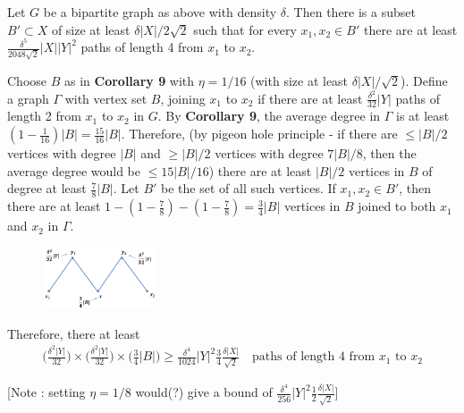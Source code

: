\documentclass[10pt,a4paper]{report}
\newenvironment{proof}
{\begin{changemargin}{1cm}{0.5cm}
	}%
	{\end{changemargin}
}
\begin{document}
\s

 Let $G$ be a bipartite graph as above with density $\delta$. Then there is a subset $B'\subset X$ of size at least $\delta |X|/2\sqrt{2}$ such that for every $x_1, x_2 \in B'$ there are at least $\frac{\delta^5}{2048 \sqrt{2}} |X| |Y|^2$ paths of length 4 from $x_1$ to $x_2$. 
\begin{proof}
\pf Choose $B$ as in \textbf{Corollary 9} with $\eta = 1/16$ (with size at least $\delta |X|/\sqrt{2}$). Define a graph $\Gamma$ with vertex set $B$, joining $x_1$ to $x_2$ if there are at least $\frac{\delta^2}{32}|Y|$ paths of length 2 from $x_1$ to $x_2$ in $G$. By \textbf{Corollary 9}, the average degree in $\Gamma$ is at least $(1-\frac{1}{16})|B| = \frac{15}{16}|B|$. Therefore, (by pigeon hole principle - if there are $\leq |B|/2$ vertices with degree $|B|$ and $\geq |B|/2$ vertices with degree $7|B|/8$, then the average degree would be $\leq 15|B|/16$) there are at least $|B|/2$ vertices in $B$ of degree at least $\frac{7}{8}|B|$. Let $B'$ be the set of all such vertices. If $x_1,x_2\in B'$, then there are at least $1-(1-\frac{7}{8})-(1-\frac{7}{8})=\frac{3}{4} |B|$ vertices in $B$ joined to both $x_1$ and $x_2$ in $\Gamma$.
\begin{figure}[h]
	\centering
	\includegraphics[width=0.3\textwidth]{1}
\end{figure}
Therefore, there at least
\begin{align*}
\Big(\frac{\delta^2 |Y|}{32}\Big) \times \Big(\frac{\delta^2 |Y|}{32} \Big) \times \Big(\frac{3}{4} |B|\Big) \geq  \frac{\delta^4}{1024} |Y|^2 \frac{3}{4} \frac{\delta |X|}{\sqrt{2}} \quad \text{paths of length 4 from } x_1 \text{ to } x_2
\end{align*} 



[Note : setting $\eta= 1/8$ would(?) give a bound of $\frac{\delta^4}{256} |Y|^2 \frac{1}{2} \frac{\delta |X|}{\sqrt{2}}$]

\eop
\end{proof}
\s
\end{document}
